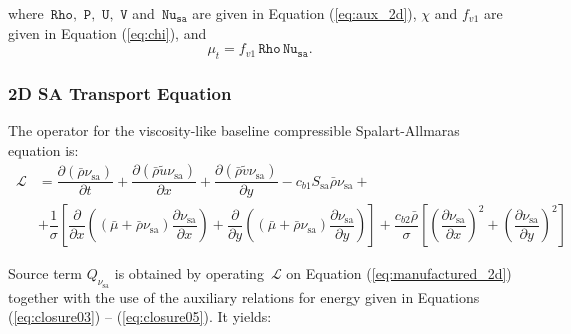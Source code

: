 \documentclass[10pt]{article}
\newcommand{\Diff}[2] {\dfrac{\partial( #1)}{\partial #2}}
\newcommand{\diff}[2] {\dfrac{\partial #1}{\partial #2}}
\newcommand{\Rho}{\,\mathtt{Rho}}
\newcommand{\PP}{\,\mathtt{P}}
\newcommand{\U}{\,\mathtt{U}}
\newcommand{\V}{\,\mathtt{V}}
\newcommand{\Nu}{\,\mathtt{Nu_{sa}}}
\newcommand{\Lo}{\,\mathcal{L}}
\newcommand{\sa}{\nu_{\mathrm{sa}}}
\newcommand{\tsa}{\mathrm{sa}}
\newcommand{\brho}{\bar{\rho}}
\newcommand{\tu}{\tilde{u}}
\newcommand{\tv}{\tilde{v}}
\newcommand{\bmu}{\bar{\mu}}
\begin{document}
where  $\Rho,\,\PP,\, \U,\,\V$ and $\Nu$ are given in Equation (\ref{eq:aux_2d}),  $\chi$ and $f_{v1}$ are given in  Equation (\ref{eq:chi}),   and  $$\mu_t= f_{v1} \Rho \Nu.$$


\subsubsection{2D SA Transport Equation}

The operator for the viscosity-like baseline compressible Spalart-Allmaras equation is:
\begin{equation*}
\begin{split}
\Lo&=  \Diff{\brho \sa }{t}+ \Diff{\brho \tu \sa }{x}+\Diff{\brho \tv \sa}{y}- c_{b1} S_\tsa \bar{\rho} \sa +\\
   &+ \dfrac{1 }{\sigma}\left[\diff{}{x}\left((\bmu+\bar{\rho} \sa) \diff{\sa}{x}\right)+\diff{}{y}\left((\bmu+\bar{\rho} \sa) \diff{\sa}{y}\right)\right] +\dfrac{c_{b2} \bar{\rho} }{\sigma} \left[ \left(\diff{\sa}{x}\right)^2 + \left(\diff{\sa}{y}\right)^2\right]
\end{split}
\end{equation*}

Source term $Q_{\sa}$ is obtained by operating $\Lo$ on Equation  (\ref{eq:manufactured_2d}) together with the use of the  auxiliary relations for energy given in Equations (\ref{eq:closure03}) -- (\ref{eq:closure05}). It yields:
\end{document}
